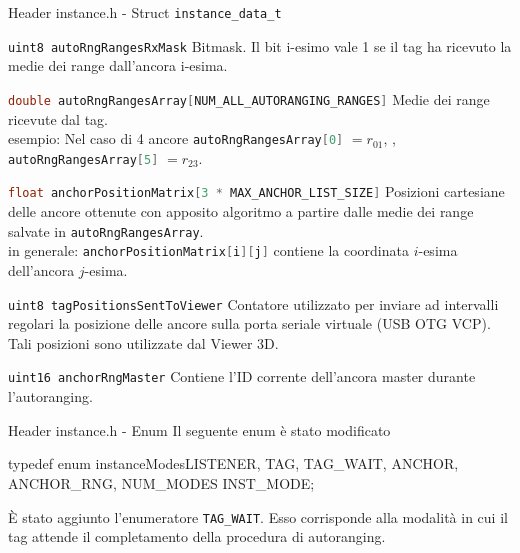 \begin{frame}[fragile]{Header instance.h - Struct \lstinline[language=C]!instance_data_t!}
  \begin{block}{\lstinline[language=C]!uint8 autoRngRangesRxMask!}
    Bitmask. Il bit i-esimo vale 1 se il tag ha ricevuto la medie dei range dall'ancora i-esima.
  \end{block}
  \begin{block}{\lstinline[language=C]!double autoRngRangesArray[NUM_ALL_AUTORANGING_RANGES]!}
    Medie dei range ricevute dal tag.\\
    \textcolor{dgreen}{esempio:} Nel caso di 4 ancore \lstinline[language=C]!autoRngRangesArray[0]! $ = r_{01}$,
    \hdots, \lstinline[language=C]!autoRngRangesArray[5]! $ = r_{23}$.
  \end{block}
  \begin{block}{\lstinline[language=C]!float anchorPositionMatrix[3 * MAX_ANCHOR_LIST_SIZE]!}
    Posizioni cartesiane delle ancore ottenute con apposito algoritmo a partire dalle medie dei range salvate
    in \lstinline[language=C]!autoRngRangesArray!.\\
    \alert{in generale:} \lstinline[language=C]!anchorPositionMatrix[i][j]! contiene la coordinata $i$-esima dell'ancora $j$-esima.
  \end{block}
\end{frame}

\begin{frame}
  \begin{block}{\lstinline[language=C]!uint8 tagPositionsSentToViewer!}
    Contatore utilizzato per inviare ad intervalli regolari la posizione delle ancore sulla porta seriale
    virtuale (USB OTG VCP). Tali posizioni sono utilizzate dal Viewer 3D.
  \end{block}
  \begin{block}{\lstinline[language=C]!uint16 anchorRngMaster!}
    Contiene l'ID corrente dell'ancora master durante l'autoranging.
  \end{block}
\end{frame}

\begin{frame}[fragile]{Header instance.h - Enum}
  Il seguente enum è stato modificato
  \begin{C}
    typedef enum instanceModes{LISTENER, TAG, TAG_WAIT, ANCHOR, ANCHOR_RNG, NUM_MODES} INST_MODE;
  \end{C}
  È stato aggiunto l'enumeratore \lstinline[language=C]!TAG_WAIT!. Esso corrisponde alla modalità in cui il tag
  attende il completamento della procedura di autoranging.
\end{frame}


